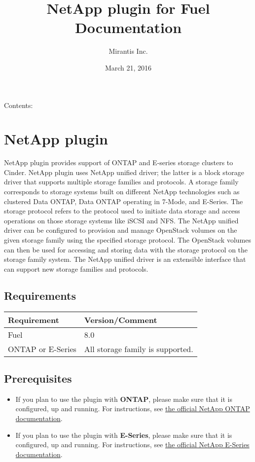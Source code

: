 \documentclass[letterpaper,10pt,english]{sphinxmanual}
\title{NetApp plugin for Fuel Documentation}
\date{March 21, 2016}
\author{Mirantis Inc.}
\begin{document}
\maketitle
\tableofcontents
{}\label{index::doc}


Contents:


\chapter{NetApp plugin}
\label{description:netapp-plugin}\label{description::doc}\label{description:guide-to-the-cinder-netapp-plugin-ver-4-0-0}
NetApp plugin provides support of ONTAP and E-series storage clusters to Cinder.
NetApp plugin uses NetApp unified driver; the latter is a
block storage driver that supports multiple storage families and protocols.
A storage family corresponds to storage systems built on different NetApp technologies
such as clustered Data ONTAP, Data ONTAP operating in 7-Mode,
and E-Series.
The storage protocol refers to the protocol used to initiate data
storage and access operations on those storage systems like iSCSI and NFS.
The NetApp unified driver can be configured to provision and manage OpenStack volumes
on the given storage family using the specified storage protocol.
The OpenStack volumes can then be used for accessing and storing data with
the storage protocol on the storage family system.
The NetApp unified driver is an extensible interface that can support new
storage families and protocols.


\section{Requirements}
\label{description:requirements}
\begin{tabulary}{\linewidth}{|L|L|}
\hline
\textsf{\relax 
Requirement
} & \textsf{\relax 
Version/Comment
}\\
\hline
Fuel
 & 
8.0
\\
\hline
ONTAP or E-Series
 & 
All storage family is supported.
\\
\hline\end{tabulary}



\section{Prerequisites}
\label{description:prerequisites}\begin{itemize}
\item {} 
If you plan to use the plugin with \textbf{ONTAP}, please make sure that it
is configured, up and running. For instructions, see \href{http://mysupport.netapp.com/documentation/productlibrary/index.html?productID=30092}{the official
NetApp ONTAP documentation}.

\item {} 
If you plan to use the plugin with \textbf{E-Series}, please make sure that it
is configured, up and running. For instructions, see \href{https://mysupport.netapp.com/info/web/ECMP1658252.html}{the official
NetApp E-Series documentation}.

\end{itemize}
\end{document}
